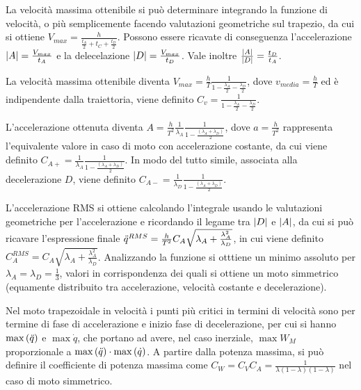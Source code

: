 La velocità massima ottenibile si può determinare integrando la funzione di velocità, o più semplicemente facendo valutazioni geometriche sul trapezio, da cui si ottiene \(V_{max} = \frac{h}{\frac{t_A}{2}+t_C +\frac{t_D}{2}}\).
Possono essere ricavate di conseguenza l'accelerazione \(\left|A\right| = \frac{V_{max}}{t_A}\) e la delecelazione \(\left|D\right| = \frac{V_{max}}{t_D}\). Vale inoltre \(\frac{\left|A\right|}{\left|D\right|} = \frac{t_D}{t_A}\).

La velocità massima ottenibile diventa \(V_{max} = \frac{h}{T} \frac{1}{1-\frac{\lambda_A}{2}-\frac{\lambda_D}{2}}\), dove \(v_{media} = \frac{h}{T}\) ed è indipendente dalla traiettoria, viene definito \(C_v = \frac{1}{1-\frac{\lambda_A}{2}-\frac{\lambda_D}{2}}\).

L'accelerazione ottenuta diventa \(A=\frac{h}{T^2} \frac{1}{\lambda_A}\frac{1}{1-\frac{\left(\lambda_A + \lambda_D \right)}{2}}\), dove \(a = \frac{h}{T^2}\) rappresenta l'equivalente valore in caso di moto con accelerazione costante, da cui viene definito \(C_{A+} = \frac{1}{\lambda_A}\frac{1}{1-\frac{\left(\lambda_A + \lambda_D \right)}{2}}\).
In modo del tutto simile, associata alla decelerazione \(D\), viene definito \(C_{A-} = \frac{1}{\lambda_D}\frac{1}{1-\frac{\left(\lambda_A + \lambda_D \right)}{2}}\).

L'accelerazione RMS si ottiene calcolando l'integrale usando le valutazioni geometriche per l'accelerazione e ricordando il legame tra \(\left|D\right|\) e \(\left|A\right|\), da cui si può ricavare l'espressione finale \(\Ddot{q}^{RMS} = \frac{h}{T^2} C_A \sqrt{\lambda_A + \frac{\lambda_A^2}{\lambda_D}}\), in cui viene definito \(C_A^{RMS} = C_A \sqrt{\lambda_A + \frac{\lambda_A^2}{\lambda_D}}\).
Analizzando la funzione si otttiene un minimo assoluto per \(\lambda_A=\lambda_D =\frac{1}{3}\), valori in corrispondenza dei quali si ottiene un moto simmetrico (equamente distribuito tra accelerazione, velocità costante e decelerazione).

Nel moto trapezoidale in velocità i punti più critici in termini di velocità sono per termine di fase di accelerazione e inizio fase di decelerazione, per cui si hanno \(\operatorname{max}\left(\Ddot{q}\right)\) e \(\max{\dot{q}}\), che portano ad avere, nel caso inerziale, \(\max{W_M}\) proporzionale a \(\operatorname{max}\left(\Ddot{q}\right) \cdot \operatorname{max}\left(\dot{q}\right)\).
A partire dalla potenza massima, si può definire il coefficiente di potenza massima come \(C_W = C_V C_A = \frac{1}{\lambda(1-\lambda)(1-\lambda)}\) nel caso di moto simmetrico.

